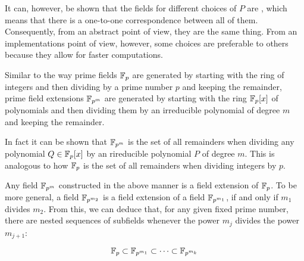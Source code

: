 It can, however, be shown that the fields for different choices of $P$ are , which means that there is a one-to-one correspondence between all of them. Consequently, from an abstract point of view, they are the same thing. From an implementations point of view, however, some choices are preferable to others because they allow for faster computations.

\begin{remark}
Similar to the way prime fields $\mathbb{F}_p$ are generated by starting with the ring of integers and then dividing by a prime number $p$ and keeping the remainder, prime field extensions $\mathbb{F}_{p^m}$ are generated by starting with the ring $\mathbb{F}_p[x]$ of polynomials and then dividing them by an irreducible polynomial of degree $m$ and keeping the remainder.

In fact it can be shown that $\mathbb{F}_{p^m}$ is the set of all remainders when dividing any polynomial $Q\in \mathbb{F}_p[x]$ by an rireducible polynomial $P$ of degree $m$. This is analogous to how $\mathbb{F}_p$ is the set of all remainders when dividing integers by $p$.
\end{remark}

Any field $\mathbb{F}_{p^m}$ constructed in the above manner is a field extension of $\mathbb{F}_p$. To be more general, a field $\mathbb{F}_{p^{m_2}}$ is a field extension of a field $\mathbb{F}_{p^{m_1}}$, if and only if $m_1$ divides $m_2$. From this, we can deduce that, for any given fixed prime number, there are nested sequences of subfields whenever the power $m_j$ divides the power $m_{j+1}$:

\begin{equation}
\mathbb{F}_p \subset \mathbb{F}_{p^{m_1}} \subset \cdots \subset \mathbb{F}_{p^{m_k}}
\end{equation}

